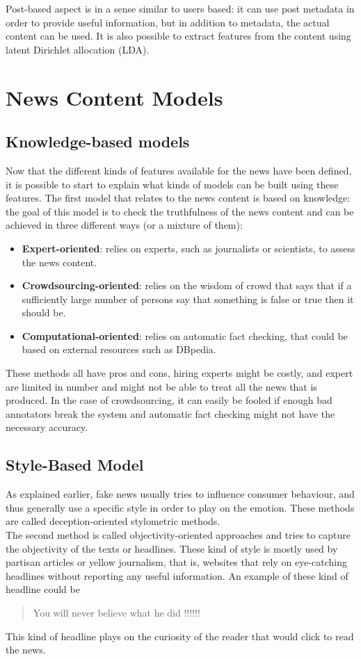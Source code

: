 Post-based aspect is in a sense similar to users based: it can use post metadata in order to provide useful information, but in addition to metadata, the actual content can be used. It is also possible to extract features from the content using latent Dirichlet allocation (LDA)\cite{blei2003latent}.
\section{News Content Models} \label{intro:models}
\subsection{Knowledge-based models}
Now that the different kinds of features available for the news have been defined, it is possible to start to explain what kinds of models can be built using these features. The first model that relates to the news content is based on knowledge: the goal of this model is to check the truthfulness of the news content and can be achieved in three different ways (or a mixture of them):
\begin{itemize}
 \item \textbf{Expert-oriented}: relies on experts, such as journalists or scientists, to assess the news content.
 \item \textbf{Crowdsourcing-oriented}: relies on the wisdom of crowd that says that if a sufficiently large number of persons say that something is false or true then it should be.
 \item \textbf{Computational-oriented}: relies on automatic fact checking, that could be based on external resources such as DBpedia.
\end{itemize}
These methods all have pros and cons, hiring experts might be costly, and expert are limited in number and might not be able to treat all the news that is produced. In the case of crowdsourcing, it can easily be fooled if enough bad annotators break the system and automatic fact checking might not have the necessary accuracy.
\subsection{Style-Based Model}
As explained earlier, fake news usually tries to influence consumer behaviour, and thus generally use a specific style in order to play on the emotion. These methods are called deception-oriented stylometric methods. \\

The second method is called objectivity-oriented approaches and tries to capture the objectivity of the texts or headlines. These kind of style is mostly used by partisan articles or yellow journalism, that is, websites that rely on eye-catching headlines without reporting any useful information. An example of these kind of headline could be
 \begin{quote}You will never believe what he did !!!!!!\end{quote} 
This kind of headline plays on the curiosity of the reader that would click to read the news.
